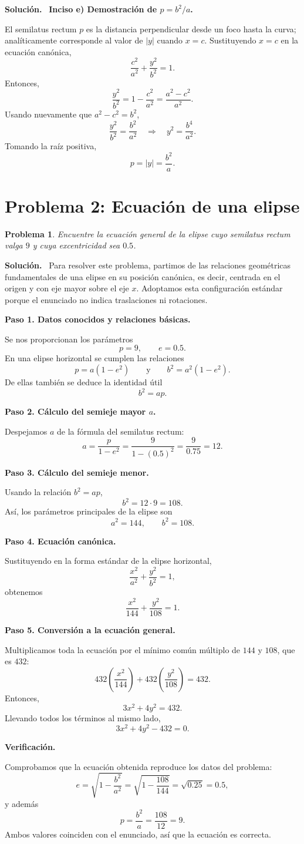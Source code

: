 \documentclass[11pt]{article}
\theoremstyle{prismstyle}
\newtheorem{problem}{Problema}
\newenvironment{solution}[1][Solución]
  {\par\textbf{#1.}\ }
  {\par}
\newcommand{\problemsection}[2]{
  \section{#1}
  \begin{problem}
  #2
  \end{problem}
}
\begin{document}
\begin{solution}
\textbf{Inciso e) Demostración de $p = b^2/a$.}

El semilatus rectum $p$ es la distancia perpendicular desde un foco hasta la curva; analíticamente corresponde al valor de $|y|$ cuando $x=c$.
Sustituyendo $x=c$ en la ecuación canónica,
\[
\frac{c^2}{a^2} + \frac{y^2}{b^2} = 1.
\]
Entonces,
\[
\frac{y^2}{b^2} = 1 - \frac{c^2}{a^2} = \frac{a^2-c^2}{a^2}.
\]
Usando nuevamente que $a^2-c^2=b^2$,
\[
\frac{y^2}{b^2} = \frac{b^2}{a^2} \quad \Rightarrow \quad y^2 = \frac{b^4}{a^2}.
\]
Tomando la raíz positiva,
\[
\boxed{p = |y| = \frac{b^2}{a}}.
\]
\end{solution}

\problemsection{Problema 2: Ecuación de una elipse}{
Encuentre la ecuación general de la elipse cuyo semilatus rectum valga $9$ y cuya excentricidad sea $0.5$.
}

\begin{solution}
Para resolver este problema, partimos de las relaciones geométricas fundamentales de una elipse en su posición canónica, es decir, centrada en el origen y con eje mayor sobre el eje $x$. Adoptamos esta configuración estándar porque el enunciado no indica traslaciones ni rotaciones.

\textbf{Paso 1. Datos conocidos y relaciones básicas.}

Se nos proporcionan los parámetros
\[
p = 9, \qquad e = 0.5.
\]
En una elipse horizontal se cumplen las relaciones
\[
p = a(1-e^2)
\qquad \text{y} \qquad
b^2 = a^2(1-e^2).
\]
De ellas también se deduce la identidad útil
\[
b^2 = ap.
\]

\textbf{Paso 2. Cálculo del semieje mayor $a$.}

Despejamos $a$ de la fórmula del semilatus rectum:
\[
a = \frac{p}{1-e^2} = \frac{9}{1-(0.5)^2} = \frac{9}{0.75} = 12.
\]

\textbf{Paso 3. Cálculo del semieje menor.}

Usando la relación $b^2 = ap$,
\[
b^2 = 12 \cdot 9 = 108.
\]
Así, los parámetros principales de la elipse son
\[
a^2 = 144, \qquad b^2 = 108.
\]

\textbf{Paso 4. Ecuación canónica.}

Sustituyendo en la forma estándar de la elipse horizontal,
\[
\frac{x^2}{a^2} + \frac{y^2}{b^2} = 1,
\]
obtenemos
\[
\frac{x^2}{144} + \frac{y^2}{108} = 1.
\]

\textbf{Paso 5. Conversión a la ecuación general.}

Multiplicamos toda la ecuación por el mínimo común múltiplo de $144$ y $108$, que es $432$:
\[
432\left(\frac{x^2}{144}\right) + 432\left(\frac{y^2}{108}\right) = 432.
\]
Entonces,
\[
3x^2 + 4y^2 = 432.
\]
Llevando todos los términos al mismo lado,
\[
\boxed{3x^2 + 4y^2 - 432 = 0}.
\]

\textbf{Verificación.}

Comprobamos que la ecuación obtenida reproduce los datos del problema:
\[
e = \sqrt{1-\frac{b^2}{a^2}} = \sqrt{1-\frac{108}{144}} = \sqrt{0.25} = 0.5,
\]
y además
\[
p = \frac{b^2}{a} = \frac{108}{12} = 9.
\]
Ambos valores coinciden con el enunciado, así que la ecuación es correcta.
\end{solution}
\end{document}
